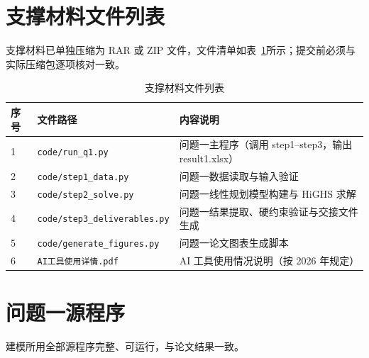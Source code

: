 \documentclass[zihao=-4,a4paper,UTF8,fontset=none]{ctexart}
\begin{document}
\section{支撑材料文件列表}

支撑材料已单独压缩为 RAR 或 ZIP 文件，文件清单如表~\ref{tab:support}所示；提交前必须与实际压缩包逐项核对一致。

\begin{longtable}{@{}p{}p{}p{}@{}}
  \caption{支撑材料文件列表}
  \label{tab:support} \\
  \toprule
  序号 & 文件路径 & 内容说明 \\
  \midrule
  1 & \texttt{code/run\_q1.py} & 问题一主程序（调用 step1--step3，输出 result1.xlsx） \\
  2 & \texttt{code/step1\_data.py} & 问题一数据读取与输入验证 \\
  3 & \texttt{code/step2\_solve.py} & 问题一线性规划模型构建与 HiGHS 求解 \\
  4 & \texttt{code/step3\_deliverables.py} & 问题一结果提取、硬约束验证与交接文件生成 \\
  5 & \texttt{code/generate\_figures.py} & 问题一论文图表生成脚本 \\
  6 & \texttt{AI工具使用详情.pdf} & AI 工具使用情况说明（按 2026 年规定） \\
  \bottomrule
\end{longtable}


\section{问题一源程序}

建模所用全部源程序完整、可运行，与论文结果一致。






\end{document}
